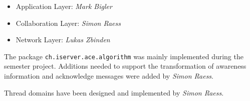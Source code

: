 \begin{itemize}
 \item Application Layer: \emph{Mark Bigler}
 \item Collaboration Layer: \emph{Simon Raess}
 \item Network Layer: \emph{Lukas Zbinden}
\end{itemize}

The package \texttt{ch.iserver.ace.algorithm} was mainly implemented during
the semester project. Additions needed to support the transformation of
awareness information and acknowledge messages were added by \emph{Simon Raess}.

Thread domains have been designed and implemented by \emph{Simon Raess}.
